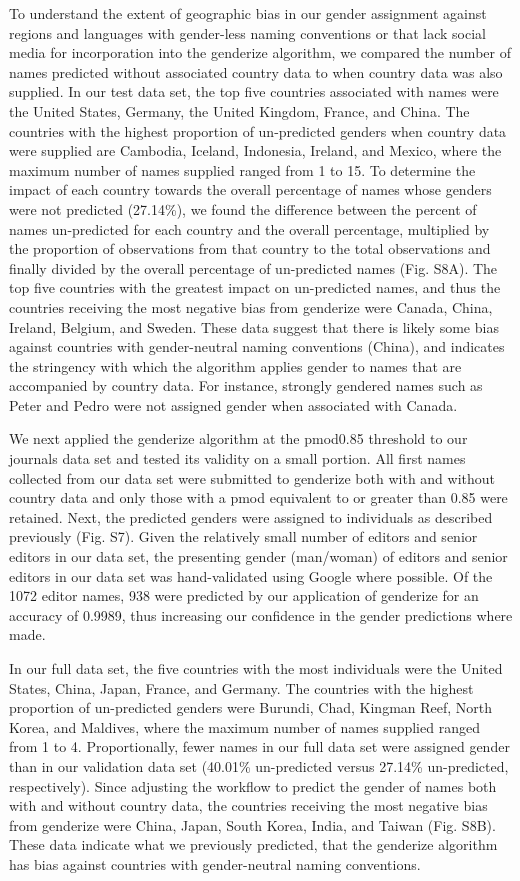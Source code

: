 \documentclass[11pt,]{article}
\begin{document}
To understand the extent of geographic bias in our gender assignment
against regions and languages with gender-less naming conventions or
that lack social media for incorporation into the genderize algorithm,
we compared the number of names predicted without associated country
data to when country data was also supplied. In our test data set, the
top five countries associated with names were the United States,
Germany, the United Kingdom, France, and China. The countries with the
highest proportion of un-predicted genders when country data were
supplied are Cambodia, Iceland, Indonesia, Ireland, and Mexico, where
the maximum number of names supplied ranged from 1 to 15. To determine
the impact of each country towards the overall percentage of names whose
genders were not predicted (27.14\%), we found the difference between
the percent of names un-predicted for each country and the overall
percentage, multiplied by the proportion of observations from that
country to the total observations and finally divided by the overall
percentage of un-predicted names (Fig. S8A). The top five countries with
the greatest impact on un-predicted names, and thus the countries
receiving the most negative bias from genderize were Canada, China,
Ireland, Belgium, and Sweden. These data suggest that there is likely
some bias against countries with gender-neutral naming conventions
(China), and indicates the stringency with which the algorithm applies
gender to names that are accompanied by country data. For instance,
strongly gendered names such as Peter and Pedro were not assigned gender
when associated with Canada.

We next applied the genderize algorithm at the pmod0.85 threshold to our
journals data set and tested its validity on a small portion. All first
names collected from our data set were submitted to genderize both with
and without country data and only those with a pmod equivalent to or
greater than 0.85 were retained. Next, the predicted genders were
assigned to individuals as described previously (Fig. S7). Given the
relatively small number of editors and senior editors in our data set,
the presenting gender (man/woman) of editors and senior editors in our
data set was hand-validated using Google where possible. Of the 1072
editor names, 938 were predicted by our application of genderize for an
accuracy of 0.9989, thus increasing our confidence in the gender
predictions where made.

In our full data set, the five countries with the most individuals were
the United States, China, Japan, France, and Germany. The countries with
the highest proportion of un-predicted genders were Burundi, Chad,
Kingman Reef, North Korea, and Maldives, where the maximum number of
names supplied ranged from 1 to 4. Proportionally, fewer names in our
full data set were assigned gender than in our validation data set
(40.01\% un-predicted versus 27.14\% un-predicted, respectively). Since
adjusting the workflow to predict the gender of names both with and
without country data, the countries receiving the most negative bias
from genderize were China, Japan, South Korea, India, and Taiwan (Fig.
S8B). These data indicate what we previously predicted, that the
genderize algorithm has bias against countries with gender-neutral
naming conventions.
\end{document}
